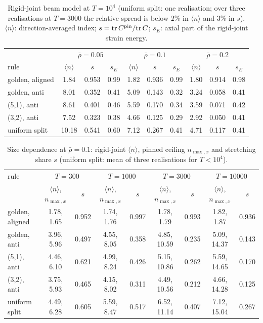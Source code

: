 \begin{table}[h]\caption{Rigid-joint beam model at $T=10^{4}$ (uniform split: one realisation; over three realisations at $T=3000$ the relative spread is below $2\%$ in $\langle n\rangle$ and $3\%$ in $s$). $\langle n\rangle$: direction-averaged index; $s=\mathrm{tr}\,C^{\rm pin}/\mathrm{tr}\,C$; $s_E$: axial part of the rigid-joint strain energy.}\label{tab:T4}
\begin{ruledtabular}\begin{tabular}{lccccccccc}
 & \multicolumn{3}{c}{$\bar\rho=0.05$} & \multicolumn{3}{c}{$\bar\rho=0.1$} & \multicolumn{3}{c}{$\bar\rho=0.2$} \\
rule & $\langle n\rangle$ & $s$ & $s_E$ & $\langle n\rangle$ & $s$ & $s_E$ & $\langle n\rangle$ & $s$ & $s_E$ \\ \hline
golden, aligned & 1.84 & 0.953 & 0.99 & 1.82 & 0.936 & 0.99 & 1.80 & 0.914 & 0.98 \\
golden, anti & 8.01 & 0.352 & 0.41 & 5.09 & 0.143 & 0.32 & 3.24 & 0.058 & 0.41 \\
(5,1), anti & 8.61 & 0.401 & 0.46 & 5.59 & 0.170 & 0.34 & 3.59 & 0.071 & 0.42 \\
(3,2), anti & 7.52 & 0.323 & 0.38 & 4.66 & 0.125 & 0.29 & 2.92 & 0.050 & 0.41 \\
uniform split & 10.18 & 0.541 & 0.60 & 7.12 & 0.267 & 0.41 & 4.71 & 0.117 & 0.41 \\
\end{tabular}\end{ruledtabular}\end{table}
\begin{table}[h]\caption{Size dependence at $\bar\rho=0.1$: rigid-joint $\langle n\rangle$, pinned ceiling $n_{\max,x}$ and stretching share $s$ (uniform split: mean of three realisations for $T<10^4$).}\label{tab:size}
\begin{ruledtabular}\begin{tabular}{lcccccccc}
rule & \multicolumn{2}{c}{$T=300$} & \multicolumn{2}{c}{$T=1000$} & \multicolumn{2}{c}{$T=3000$} & \multicolumn{2}{c}{$T=10000$} \\
 & $\langle n\rangle$, $n_{\max,x}$ & $s$ & $\langle n\rangle$, $n_{\max,x}$ & $s$ & $\langle n\rangle$, $n_{\max,x}$ & $s$ & $\langle n\rangle$, $n_{\max,x}$ & $s$ \\ \hline
golden, aligned & 1.78, 1.65 & 0.952 & 1.74, 1.76 & 0.997 & 1.78, 1.79 & 0.993 & 1.82, 1.87 & 0.936 \\
golden, anti & 3.96, 5.96 & 0.497 & 4.55, 8.05 & 0.358 & 4.85, 10.59 & 0.235 & 5.09, 14.37 & 0.143 \\
(5,1), anti & 4.46, 6.10 & 0.621 & 4.99, 8.24 & 0.426 & 5.15, 10.86 & 0.262 & 5.59, 14.65 & 0.170 \\
(3,2), anti & 3.75, 5.93 & 0.465 & 4.15, 8.02 & 0.311 & 4.49, 10.56 & 0.212 & 4.66, 14.28 & 0.125 \\
uniform split & 4.49, 6.28 & 0.605 & 5.59, 8.47 & 0.517 & 6.52, 11.14 & 0.407 & 7.12, 15.04 & 0.267 \\
\end{tabular}\end{ruledtabular}\end{table}
